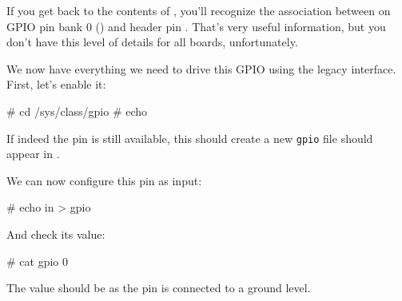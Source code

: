 If you get back to the contents of , you'll
recognize the association between  on GPIO pin bank 0
() and header pin . That's very useful
information, but you don't have this level of details for all boards,
unfortunately.

We now have everything we need to drive this GPIO using the legacy
interface. First, let's enable it:

\begin{bashinput}
# cd /sys/class/gpio
# echo %
\end{bashinput}

If indeed the pin is still available, this should create a new
{\tt gpio\gpionum} file should appear in .

We can now configure this pin as input:

\begin{bashinput}
# echo in > gpio%
\end{bashinput}

And check its value:

\begin{bashinput}
# cat gpio%
0
\end{bashinput}

The value should be  as the pin is connected to a ground level.

